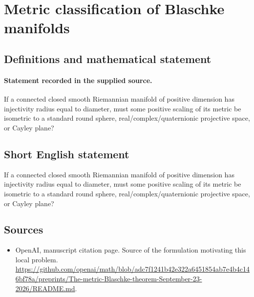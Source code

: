 \documentclass[11pt]{article}
\begin{document}
\section*{Metric classification of Blaschke manifolds}\label{30007148}
\subsection{Definitions and mathematical statement}
\paragraph{Statement recorded in the supplied source.}
If a connected closed smooth Riemannian manifold of positive dimension has injectivity radius equal to diameter, must some positive scaling of its metric be isometric to a standard round sphere, real/complex/quaternionic projective space, or Cayley plane?
\subsection{Short English statement}
If a connected closed smooth Riemannian manifold of positive dimension has injectivity radius equal to diameter, must some positive scaling of its metric be isometric to a standard round sphere, real/complex/quaternionic projective space, or Cayley plane?
\subsection{Sources}
\begin{itemize}
\item[S1] OpenAI, manuscript citation page. Source of the formulation motivating this local problem.
\url{https://github.com/openai/math/blob/adc7f1241b42e322a6451854ab7e4b4c146bf78a/preprints/The-metric-Blaschke-theorem-September-23-2026/README.md}.
\end{itemize}
\end{document}
